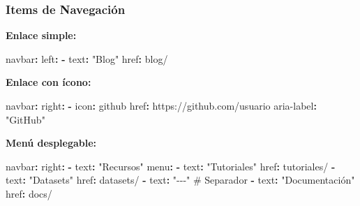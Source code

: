 \documentclass[
  doc,
  floatsintext,
  longtable,
  a4paper,
  nolmodern,
  notxfonts,
  notimes,
  12pt,
  colorlinks=true,linkcolor=blue,citecolor=blue,urlcolor=blue]{apa7}
\newenvironment{Shaded}{\begin{snugshade}}{\end{snugshade}}
\newcommand{\AttributeTok}[1]{\textcolor[rgb]{0.40,0.45,0.13}{#1}}
\newcommand{\CommentTok}[1]{\textcolor[rgb]{0.37,0.37,0.37}{#1}}
\newcommand{\FunctionTok}[1]{\textcolor[rgb]{0.28,0.35,0.67}{#1}}
\newcommand{\KeywordTok}[1]{\textcolor[rgb]{0.00,0.23,0.31}{\textbf{#1}}}
\newcommand{\StringTok}[1]{\textcolor[rgb]{0.13,0.47,0.30}{#1}}
\begin{document}
\subsubsection{Items de Navegación}\label{items-de-navegaciuxf3n}

\textbf{Enlace simple:}

\begin{Shaded}
\begin{Highlighting}[]
\FunctionTok{navbar}\KeywordTok{:}
\AttributeTok{  }\FunctionTok{left}\KeywordTok{:}
\AttributeTok{    }\KeywordTok{{-}}\AttributeTok{ }\FunctionTok{text}\KeywordTok{:}\AttributeTok{ }\StringTok{"Blog"}
\AttributeTok{      }\FunctionTok{href}\KeywordTok{:}\AttributeTok{ blog/}
\end{Highlighting}
\end{Shaded}

\textbf{Enlace con ícono:}

\begin{Shaded}
\begin{Highlighting}[]
\FunctionTok{navbar}\KeywordTok{:}
\AttributeTok{  }\FunctionTok{right}\KeywordTok{:}
\AttributeTok{    }\KeywordTok{{-}}\AttributeTok{ }\FunctionTok{icon}\KeywordTok{:}\AttributeTok{ github}
\AttributeTok{      }\FunctionTok{href}\KeywordTok{:}\AttributeTok{ https://github.com/usuario}
\AttributeTok{      }\FunctionTok{aria{-}label}\KeywordTok{:}\AttributeTok{ }\StringTok{"GitHub"}
\end{Highlighting}
\end{Shaded}

\textbf{Menú desplegable:}

\begin{Shaded}
\begin{Highlighting}[]
\FunctionTok{navbar}\KeywordTok{:}
\AttributeTok{  }\FunctionTok{right}\KeywordTok{:}
\AttributeTok{    }\KeywordTok{{-}}\AttributeTok{ }\FunctionTok{text}\KeywordTok{:}\AttributeTok{ }\StringTok{"Recursos"}
\AttributeTok{      }\FunctionTok{menu}\KeywordTok{:}
\AttributeTok{        }\KeywordTok{{-}}\AttributeTok{ }\FunctionTok{text}\KeywordTok{:}\AttributeTok{ }\StringTok{"Tutoriales"}
\AttributeTok{          }\FunctionTok{href}\KeywordTok{:}\AttributeTok{ tutoriales/}
\AttributeTok{        }\KeywordTok{{-}}\AttributeTok{ }\FunctionTok{text}\KeywordTok{:}\AttributeTok{ }\StringTok{"Datasets"}
\AttributeTok{          }\FunctionTok{href}\KeywordTok{:}\AttributeTok{ datasets/}
\AttributeTok{        }\KeywordTok{{-}}\AttributeTok{ }\FunctionTok{text}\KeywordTok{:}\AttributeTok{ }\StringTok{"{-}{-}{-}"}\CommentTok{              \# Separador}
\AttributeTok{        }\KeywordTok{{-}}\AttributeTok{ }\FunctionTok{text}\KeywordTok{:}\AttributeTok{ }\StringTok{"Documentación"}
\AttributeTok{          }\FunctionTok{href}\KeywordTok{:}\AttributeTok{ docs/}
\end{Highlighting}
\end{Shaded}
\end{document}
